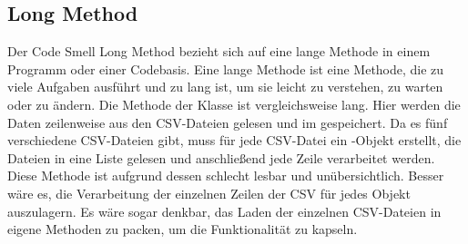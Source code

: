\subsection{Long Method}\label{LM}
Der Code Smell Long Method bezieht sich auf eine lange Methode in einem Programm oder einer Codebasis. Eine lange Methode ist eine Methode, die zu viele Aufgaben ausführt und zu lang ist, um sie leicht zu verstehen, zu warten oder zu ändern. 
Die Methode  der Klasse \href{https://github.com/MichaelaHaag/RezeptApp/blob/main/1-Adapter/src/main/java/de/rezeptapp/adapter/Datenpersistenz/DataReader.java}{} ist vergleichsweise lang. Hier werden die Daten zeilenweise aus den CSV-Dateien gelesen und im  gespeichert.
Da es fünf verschiedene CSV-Dateien gibt, muss für jede CSV-Datei ein -Objekt erstellt, die Dateien in eine Liste gelesen und anschließend jede Zeile verarbeitet werden. Diese Methode ist aufgrund dessen schlecht lesbar und unübersichtlich. Besser wäre es, die Verarbeitung der einzelnen Zeilen der CSV für jedes Objekt auszulagern. Es wäre sogar denkbar, das Laden der einzelnen CSV-Dateien in eigene Methoden zu packen, um die Funktionalität zu kapseln.

